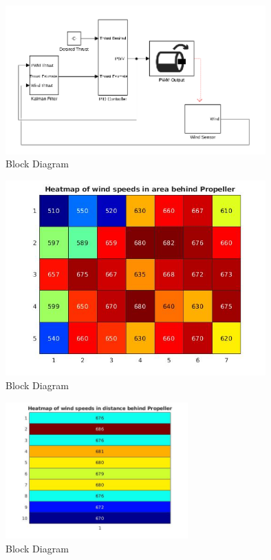 \documentclass[conference]{IEEEtran}
\begin{document}
\subsection{}
	\begin{figure}[htbp]
	\includegraphics[width=10cm]{images/block_diagram.png}
	\caption{Block Diagram}
	\label{block_diagram}
	\end{figure}
	\begin{figure}[htbp]
	\includegraphics[width=10cm]{images/figure_1/area_heatmap.jpg}
	\caption{Block Diagram}
	\label{area}
	\end{figure}
	\begin{figure}[htbp]
	\includegraphics[width = 7cm]{images/figure_1/dist_heatmap.jpg}
	\caption{Block Diagram}
	\label{dist}
\end{figure}
\end{document}
